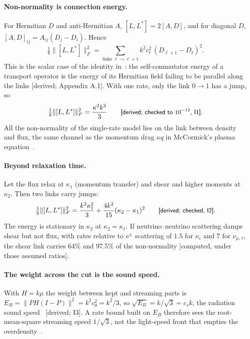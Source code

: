 \documentclass[11pt]{article}
\newcommand{\grade}[1]{\textsf{\small[#1]}}
\begin{document}
\paragraph{Non-normality is connection energy.} For Hermitian $D$ and anti-Hermitian $A$, $[L,L^\ast]=2[A,D]$, and for diagonal $D$, $[A,D]_{ij}=A_{ij}(D_j-D_i)$. Hence
\begin{equation}
\tfrac18\lVert[L,L^\ast]\rVert_F^2=\sum_{\text{links }\ell\to\ell+1}k^2c_\ell^2\,(D_{\ell+1}-D_\ell)^2 .
\end{equation}
This is the scalar case of the identity in~\cite{CE}: the self-commutator energy of a transport operator is the energy of its Hermitian field failing to be parallel along the links \grade{derived; Appendix A.1}. With one rate, only the link $0\to1$ has a jump, so
\begin{equation}
\tfrac18\lVert[L,L^\ast]\rVert_F^2=\frac{\kappa^2k^2}{3}\qquad\text{\grade{derived; checked to $10^{-12}$, I1}}.
\end{equation}
All the non-normality of the single-rate model lies on the link between density and flux, the same channel as the momentum drag $\kappa q$ in McCormick's plasma equation~\cite[Eq.~(6)]{McC}.

\paragraph{Beyond relaxation time.} Let the flux relax at $\kappa_1$ (momentum transfer) and shear and higher moments at $\kappa_2$. Then two links carry jumps:
\begin{equation}
\tfrac18\lVert[L,L^\ast]\rVert_F^2=\frac{k^2\kappa_1^2}{3}+\frac{4k^2}{15}(\kappa_2-\kappa_1)^2\qquad\text{\grade{derived; checked, I2}}.
\end{equation}
The energy is stationary in $\kappa_2$ at $\kappa_2=\kappa_1$. If neutrino--neutrino scattering damps shear but not flux, with rates relative to e$^\pm$ scattering of $1.5$ for $\nu_e$ and $7$ for $\nu_{\mu,\tau}$, the shear link carries 64\% and 97.5\% of the non-normality \grade{computed, under those assumed ratios}.

\paragraph{The weight across the cut is the sound speed.} With $H=k\mu$ the weight between kept and streaming parts is $E_B=\lVert PH(I-P)\rVert^2=k^2c_0^2=k^2/3$, so $\sqrt{E_B}=k/\sqrt3=c_s k$, the radiation sound speed~\cite{WB} \grade{derived; I3}. A rate bound built on $E_B$ therefore sees the root-mean-square streaming speed $1/\sqrt3$, not the light-speed front that empties the overdensity~\cite{OSL}.
\end{document}
